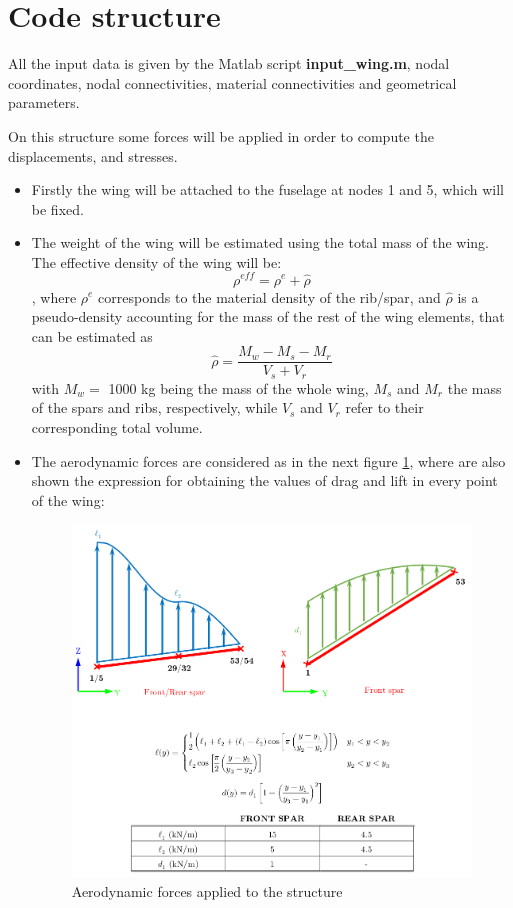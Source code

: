 \section{Code structure}

All the input data is given by the Matlab script \textbf{input\_wing.m}, nodal
coordinates, nodal connectivities, material connectivities and geometrical
parameters.

On this structure some forces will be applied in order to compute the displacements,
and stresses.

\begin{itemize}
	\item Firstly the wing will be attached to the fuselage at nodes 1 and 5,
	which will be fixed.

	\item The weight of the wing will be estimated using the total mass of the wing.
	The effective density of the wing will be:
	\begin{equation}
		\rho^{eff}=\rho^e + \hat{\rho}
	\end{equation}
	, where $\rho^e$ corresponds to the material density of the rib/spar,
	and $\hat{\rho}$ is a pseudo-density accounting for the mass of the rest
	of the wing elements, that can be estimated as
	\begin{equation}
		\hat{\rho} = \frac{M_w - M_s - M_r}{V_s + V_r}
	\end{equation}
	with $M_w =$ 1000 kg being the mass of the whole wing, $M_s$ and $M_r$ the
	mass of the spars and ribs, respectively, while $V_s$ and $V_r$ refer to
	their corresponding total volume.

	\item The aerodynamic forces are considered as in the next figure
	\ref{fig:drag_lift}, where are also shown the expression for obtaining the
	values of drag and lift in every point of the wing:
	\begin{figure}[h]
		\centering
		\includegraphics[width=\textwidth]{img/drag_lift.png}
		\caption{Aerodynamic forces applied to the structure}
		\label{fig:drag_lift}
	\end{figure}


\end{itemize}
